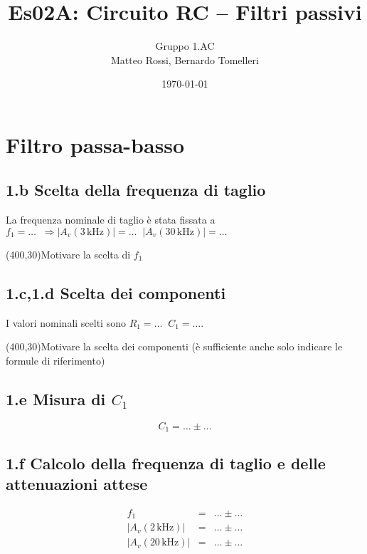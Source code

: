 \documentclass[10pt,a4paper]{article}
\author{Gruppo 1.AC \\ Matteo Rossi, Bernardo Tomelleri}
\title{Es02A: Circuito RC -- Filtri passivi}
\begin{document}
\date{\today}
\maketitle

\setcounter{section}{1}

\section*{Filtro passa-basso}

\subsection*{1.b Scelta della frequenza di taglio}

La frequenza nominale di taglio \`e stata fissata a $f_1 = \ldots\;\; \Rightarrow |A_v(3\,\mathrm{kHz})| = \ldots\;\; |A_v(30\,\mathrm{kHz})| = \ldots\;\; $  

\vspace{0.5cm}
\framebox(400,30){Motivare la scelta di $f_1$}

\subsection*{1.c,1.d Scelta dei componenti}

I valori nominali scelti sono $R_1 = \dots\;\;C_1 = \ldots$.  

\vspace{0.5cm}
\framebox(400,30){Motivare la scelta dei componenti (\`e sufficiente  anche solo indicare le formule di riferimento)}

\subsection*{1.e Misura di $C_1$}
\[
C_1 = \ldots \pm \ldots 
\]

\subsection*{1.f Calcolo della frequenza di taglio e delle attenuazioni attese}
\[
\begin{array}{rcl}
f_1 &=& \ldots \pm \ldots\\
|A_v(2\,\mathrm{kHz})| &=& \ldots \pm \ldots\\
|A_v(20\,\mathrm{kHz})| &=& \ldots \pm \ldots
\end{array}
\]
\end{document}

